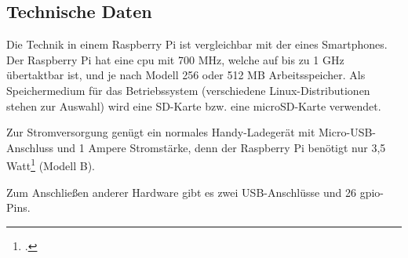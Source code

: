 \subsection{Technische Daten}
Die Technik in einem Raspberry Pi ist vergleichbar mit der eines Smartphones. Der Raspberry Pi hat eine \acrshort{cpu} mit 700 MHz, welche auf bis zu 1 GHz übertaktbar ist, und je nach Modell 256 oder 512 MB Arbeitsspeicher. Als Speichermedium für das Betriebssystem (verschiedene Linux-Distributionen stehen zur Auswahl) wird eine SD-Karte bzw. eine microSD-Karte verwendet.

Zur Stromversorgung genügt ein normales Handy-Ladegerät mit Micro-USB-Anschluss und 1 \gls{Ampere} Stromstärke, denn der Raspberry Pi benötigt nur 3,5 Watt\footcite{strom} (Modell B).

Zum Anschließen anderer Hardware gibt es zwei USB-Anschlüsse und 26 \gls{gpio}-Pins.
